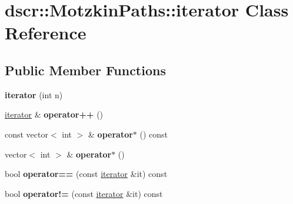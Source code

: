 \hypertarget{classdscr_1_1_motzkin_paths_1_1iterator}{\section{dscr\-:\-:Motzkin\-Paths\-:\-:iterator Class Reference}
\label{classdscr_1_1_motzkin_paths_1_1iterator}
}
\subsection*{Public Member Functions}
\begin{DoxyCompactItemize}
\item 
\hypertarget{classdscr_1_1_motzkin_paths_1_1iterator_ac0b8bb3baf013a94bbf11ebe984d4d92}{{\bfseries iterator} (int n)}\label{classdscr_1_1_motzkin_paths_1_1iterator_ac0b8bb3baf013a94bbf11ebe984d4d92}

\item 
\hypertarget{classdscr_1_1_motzkin_paths_1_1iterator_a4381c0fdcc2e9a95b5a4182a98b8c623}{\hyperlink{classdscr_1_1_motzkin_paths_1_1iterator}{iterator} \& {\bfseries operator++} ()}\label{classdscr_1_1_motzkin_paths_1_1iterator_a4381c0fdcc2e9a95b5a4182a98b8c623}

\item 
\hypertarget{classdscr_1_1_motzkin_paths_1_1iterator_abe967055dbafda9e201481d6459bb897}{const vector$<$ int $>$ \& {\bfseries operator$\ast$} () const }\label{classdscr_1_1_motzkin_paths_1_1iterator_abe967055dbafda9e201481d6459bb897}

\item 
\hypertarget{classdscr_1_1_motzkin_paths_1_1iterator_a85a7980bd9b6a2d7bb535126dc49b48a}{vector$<$ int $>$ \& {\bfseries operator$\ast$} ()}\label{classdscr_1_1_motzkin_paths_1_1iterator_a85a7980bd9b6a2d7bb535126dc49b48a}

\item 
\hypertarget{classdscr_1_1_motzkin_paths_1_1iterator_ae5eafe0b515caf1d033be94361377abd}{bool {\bfseries operator==} (const \hyperlink{classdscr_1_1_motzkin_paths_1_1iterator}{iterator} \&it) const }\label{classdscr_1_1_motzkin_paths_1_1iterator_ae5eafe0b515caf1d033be94361377abd}

\item 
\hypertarget{classdscr_1_1_motzkin_paths_1_1iterator_a2b6e64608e1686a12e1ba33be55be6c6}{bool {\bfseries operator!=} (const \hyperlink{classdscr_1_1_motzkin_paths_1_1iterator}{iterator} \&it) const }\label{classdscr_1_1_motzkin_paths_1_1iterator_a2b6e64608e1686a12e1ba33be55be6c6}

\end{DoxyCompactItemize}
